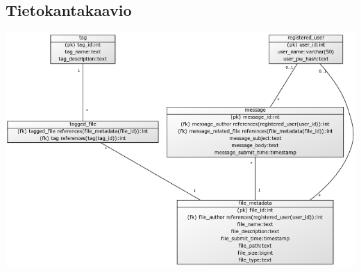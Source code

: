 \documentclass[10pt,a4paper]{article}
\begin{document}
\subsection{Tietokantakaavio}
\includegraphics[scale=0.5]{kaaviot/tietokantakaavio.png}
\end{document}
